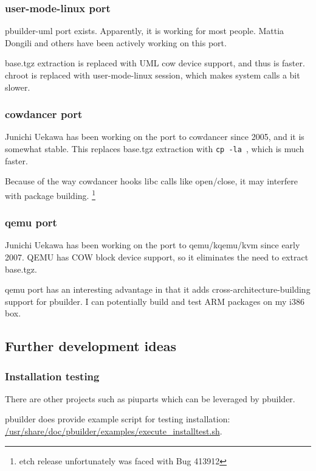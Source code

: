 \documentclass[a4paper]{article}
\begin{document}
\subsubsection{user-mode-linux port}

pbuilder-uml port exists. Apparently, it is working for most people.
Mattia Dongili and others have been actively working on this port.

base.tgz extraction is replaced with UML cow device support, and thus is
faster. chroot is replaced with user-mode-linux session, which makes
system calls a bit slower.

\subsubsection{cowdancer port}

Junichi Uekawa has been working on the port to cowdancer since 2005, and
it is somewhat stable.  This replaces base.tgz extraction with
\texttt{cp -la }, which is much faster.

Because of the way cowdancer hooks libc calls like open/close, it may
interfere with package building.  \footnote{etch release unfortunately
was faced with Bug 413912}

\subsubsection{qemu port}

Junichi Uekawa has been working on the port to qemu/kqemu/kvm since
early 2007. QEMU has COW block device support, so it eliminates the need
to extract base.tgz.

qemu port has an interesting advantage in that it adds
cross-architecture-building support for pbuilder. I can potentially
build and test ARM packages on my i386 box.

\subsection{Further development ideas}

\subsubsection{Installation testing}

There are other projects such as piuparts which can be leveraged by
pbuilder.  

pbuilder does provide example script for testing installation:
\url{/usr/share/doc/pbuilder/examples/execute_installtest.sh}.
\end{document}
